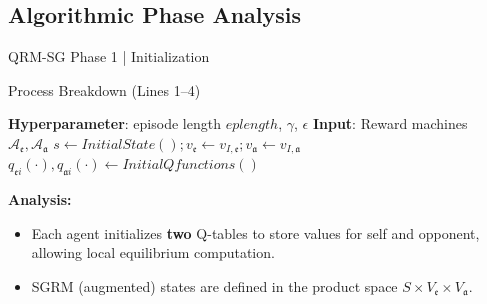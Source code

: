 \documentclass[10pt, aspectratio=169]{beamer}
\newcommand{\evidenzia}[1]{\textcolor{verdeSalvia}{\textbf{#1}}}
\begin{document}
\subsection{Algorithmic Phase Analysis}

\begin{frame}{QRM-SG Phase 1 | Initialization}
    \begin{block}{Process Breakdown (Lines 1--4)}
    \begin{algorithmic}
        \vspace{0.2cm}
        \STATE \textbf{Hyperparameter}: episode length $eplength$, $\gamma$, $\epsilon$
        \STATE \textbf{Input}: Reward machines $\mathcal{A}_{\mathfrak{e}}, \mathcal{A}_{\mathfrak{a}}$
        \vspace{0.2cm}
        \STATE $s \leftarrow InitialState(); v_{\mathfrak{e}} \leftarrow v_{I,\mathfrak{e}}; v_{\mathfrak{a}} \leftarrow v_{I,\mathfrak{a}}$ 
        \STATE $q_{\mathfrak{e}i}(\cdot), q_{\mathfrak{a}i}(\cdot) \leftarrow InitialQfunctions()$ 
    \end{algorithmic}
    \end{block}
    \evidenzia{Analysis:}
    \begin{itemize}
        \item Each agent initializes \evidenzia{two} Q-tables to store values for self and opponent, allowing local equilibrium computation. 
        \item SGRM (augmented) states are defined in the product space $S \times V_{\mathfrak{e}} \times V_{\mathfrak{a}}$.%
    \end{itemize}
\end{frame}
\end{document}
